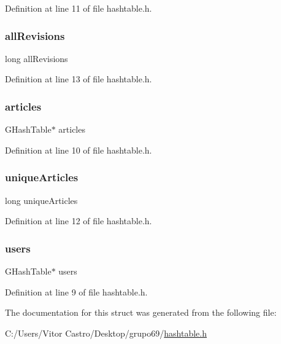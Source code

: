 Definition at line 11 of file hashtable.\+h.

\mbox{\label{struct_t_c_d__istruct_ae688e4b4290e746a001f5d0343d8bf0c}} 
\subsubsection{\texorpdfstring{all\+Revisions}{allRevisions}}
{\footnotesize\ttfamily long all\+Revisions}



Definition at line 13 of file hashtable.\+h.

\mbox{\label{struct_t_c_d__istruct_adc1bc7e9b16a11d6c3bc9b68623ad2b9}} 
\subsubsection{\texorpdfstring{articles}{articles}}
{\footnotesize\ttfamily G\+Hash\+Table$\ast$ articles}



Definition at line 10 of file hashtable.\+h.

\mbox{\label{struct_t_c_d__istruct_abc8b7c1fae0bcecc56740166a36ef37e}} 
\subsubsection{\texorpdfstring{unique\+Articles}{uniqueArticles}}
{\footnotesize\ttfamily long unique\+Articles}



Definition at line 12 of file hashtable.\+h.

\mbox{\label{struct_t_c_d__istruct_aa7c08dffa7cde1f8f0d0993fc0fcbec4}} 
\subsubsection{\texorpdfstring{users}{users}}
{\footnotesize\ttfamily G\+Hash\+Table$\ast$ users}



Definition at line 9 of file hashtable.\+h.



The documentation for this struct was generated from the following file\+:\begin{DoxyCompactItemize}
\item 
C\+:/\+Users/\+Vitor Castro/\+Desktop/grupo69/\hyperlink{hashtable_8h}{hashtable.\+h}\end{DoxyCompactItemize}
